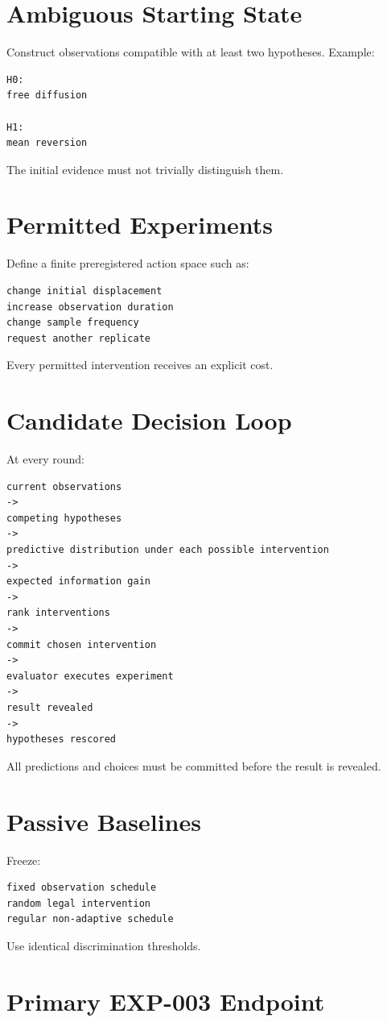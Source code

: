 \documentclass[11pt]{article}
\begin{document}
\section{Ambiguous Starting State}

Construct observations compatible with at least two hypotheses. Example:
\begin{verbatim}
H0:
free diffusion

H1:
mean reversion
\end{verbatim}
The initial evidence must not trivially distinguish them.

\section{Permitted Experiments}

Define a finite preregistered action space such as:
\begin{verbatim}
change initial displacement
increase observation duration
change sample frequency
request another replicate
\end{verbatim}
Every permitted intervention receives an explicit cost.

\section{Candidate Decision Loop}

At every round:
\begin{verbatim}
current observations
->
competing hypotheses
->
predictive distribution under each possible intervention
->
expected information gain
->
rank interventions
->
commit chosen intervention
->
evaluator executes experiment
->
result revealed
->
hypotheses rescored
\end{verbatim}
All predictions and choices must be committed before the result is revealed.

\section{Passive Baselines}

Freeze:
\begin{verbatim}
fixed observation schedule
random legal intervention
regular non-adaptive schedule
\end{verbatim}
Use identical discrimination thresholds.

\section{Primary EXP-003 Endpoint}
\end{document}
